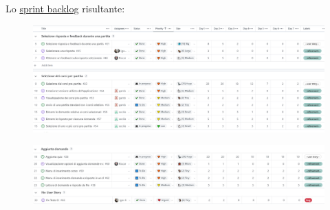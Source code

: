 
Lo \href{https://github.com/orgs/ISIQuiz/projects/3/views/17}{sprint backlog} risultante:

\begin{figure}[H]
    \centering
    \includegraphics[width=\textwidth]{process/Img/Sprint6BL1.jpg}
    \label{fig:Sprint6BL1}
\end{figure}
\begin{figure}[H]
    \centering
    \includegraphics[width=\textwidth]{process/Img/Sprint6BL2.jpg}
    \label{fig:Sprint6BL2}
\end{figure}

